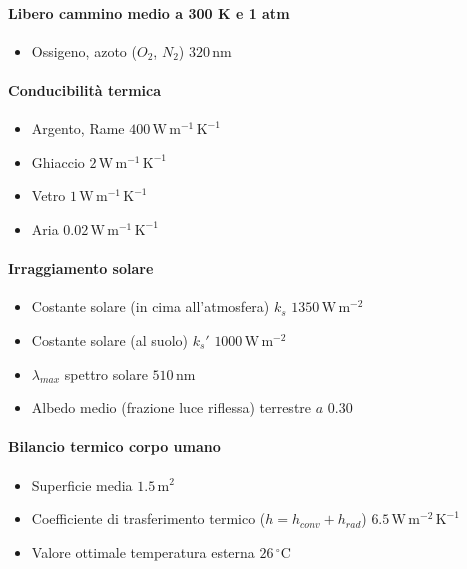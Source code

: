 \documentclass[10pt, oneside]{book}
\begin{document}
\paragraph{Libero cammino medio a 300 K e 1 atm}
\begin{itemize}
\item Ossigeno, azoto ($O_2$, $N_2$) \dotfill $ 320 \, \mathrm{nm}$ 
\end{itemize}
\paragraph{Conducibilità termica}
\begin{itemize}
\item Argento, Rame \dotfill $ 400 \, \mathrm{W \, m^{-1} \, K^{-1}}$ 

\item Ghiaccio \dotfill $ 2 \, \mathrm{W \, m^{-1} \, K^{-1}}$ 

\item Vetro \dotfill $ 1 \, \mathrm{W \, m^{-1} \, K^{-1}}$ 

\item Aria \dotfill $ 0.02 \, \mathrm{W \, m^{-1} \, K^{-1}}$ 
\end{itemize}

\paragraph{Irraggiamento solare}
\begin{itemize}
\item Costante solare (in cima all'atmosfera) $k_s$ \dotfill $ 1350 \, \mathrm{W \, m^{-2}}$ 
\item Costante solare (al suolo) $k_s'$ \dotfill $ 1000 \, \mathrm{W \, m^{-2}}$ 
\item $\lambda_{max}$ spettro solare \dotfill $ 510 \, \mathrm{nm}$ 
\item Albedo medio (frazione luce riflessa) terrestre $a$ \dotfill $ 0.30$ 
\end{itemize}
\paragraph{Bilancio termico corpo umano}
\begin{itemize}
\item Superficie media \dotfill $ 1.5 \, \mathrm{m^2}$ 
\item Coefficiente di trasferimento termico ($h = h_{conv} + h_{rad}$) \dotfill $ 6.5 \, \mathrm{W \, m^{-2} \, K^{-1}}$ 
\item Valore ottimale temperatura esterna \dotfill $ 26 \, \mathrm{{}^\circ C}$ 
\end{itemize}
\end{document}
